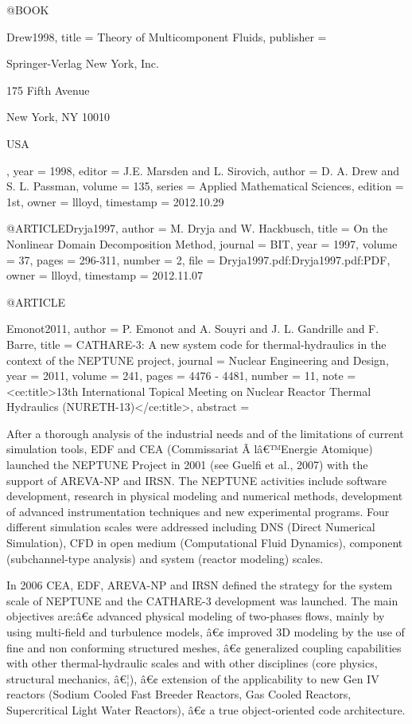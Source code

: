 {@BOOK{Drew1998,
  title = {Theory of Multicomponent Fluids},
  publisher = {Springer-Verlag New York, Inc.
	
	175 Fifth Avenue
	
	New York, NY 10010
	
	USA},
  year = {1998},
  editor = {J.E. Marsden and L. Sirovich},
  author = {D. A. Drew and S. L. Passman},
  volume = {135},
  series = {Applied Mathematical Sciences},
  edition = {1st},
  owner = {llloyd},
  timestamp = {2012.10.29}
}

@ARTICLE{Dryja1997,
  author = {M. Dryja and W. Hackbusch},
  title = {On the Nonlinear Domain Decomposition Method},
  journal = {BIT},
  year = {1997},
  volume = {37},
  pages = {296-311},
  number = {2},
  file = {Dryja1997.pdf:Dryja1997.pdf:PDF},
  owner = {llloyd},
  timestamp = {2012.11.07}
}

@ARTICLE{Emonot2011,
  author = {P. Emonot and A. Souyri and J. L. Gandrille and F. Barre},
  title = {{CATHARE-3}: A new system code for thermal-hydraulics in the context
	of the NEPTUNE project},
  journal = {Nuclear Engineering and Design},
  year = {2011},
  volume = {241},
  pages = {4476 - 4481},
  number = {11},
  note = {<ce:title>13th International Topical Meeting on Nuclear Reactor Thermal
	Hydraulics (NURETH-13)</ce:title>},
  abstract = {After a thorough analysis of the industrial needs and of the limitations
	of current simulation tools, EDF and CEA (Commissariat Ã lâ€™Energie
	Atomique) launched the NEPTUNE Project in 2001 (see Guelfi et al.,
	2007) with the support of AREVA-NP and IRSN. The NEPTUNE activities
	include software development, research in physical modeling and numerical
	methods, development of advanced instrumentation techniques and new
	experimental programs. Four different simulation scales were addressed
	including DNS (Direct Numerical Simulation), CFD in open medium (Computational
	Fluid Dynamics), component (subchannel-type analysis) and system
	(reactor modeling) scales.
	
	In 2006 CEA, EDF, AREVA-NP and IRSN defined the strategy for the system
	scale of NEPTUNE and the CATHARE-3 development was launched. The
	main objectives are:â€¢ advanced physical modeling of two-phases
	flows, mainly by using multi-field and turbulence models, â€¢ improved
	3D modeling by the use of fine and non conforming structured meshes,
	â€¢ generalized coupling capabilities with other thermal-hydraulic
	scales and with other disciplines (core physics, structural mechanics,
	â€¦), â€¢ extension of the applicability to new Gen IV reactors (Sodium
	Cooled Fast Breeder Reactors, Gas Cooled Reactors, Supercritical
	Light Water Reactors), â€¢ a true object-oriented code architecture.
	
}}}
